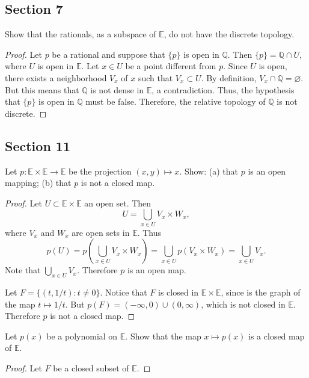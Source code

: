 \documentclass[12pt]{article}
\newcommand{\Q}{\mathbb{Q}}
\newcommand{\E}{\mathbb{E}}
\begin{document}
\subsection*{Section 7}
\begin{problem}{3} Show that the rationals, as a subspace of $\E$, do not have the discrete topology.
\end{problem}
\begin{proof}
    Let $p$ be a rational and suppose that $\{p\}$ is open in $\Q$. Then $\{p\} = \Q \cap U$, where $U$ is open in $\E.$ Let $x \in U$ be a point different from $p.$ Since $U$ is open, there exists a neighborhood $V_x$ of $x$ such that $V_x \subset U.$ By definition, $V_x \cap \Q = \varnothing$. But this means that $\Q$ is not dense in $\E$, a contradiction. Thus, the hypothesis that $\{p\}$ is open in $\Q$ must be false. Therefore, the relative topology of $\Q$ is not discrete.
\end{proof}

\subsection*{Section 11}

\begin{problem}{1} Let $p: \E \times \E \rightarrow \E$ be the projection $(x, y) \mapsto x.$ Show: (a) that $p$ is an open mapping; (b) that $p$ is not a closed map.
\end{problem}
\begin{proof}
    Let $U \subset \E \times \E$ an open set. Then 
    $$U = \bigcup_{x \in U} V_x \times W_x,$$
    where $V_x$ and $W_x$ are open sets in $\E.$ Thus
    $$p(U) = p\left(\bigcup_{x \in U} V_x \times W_x \right) = \bigcup_{x \in U}p(V_x \times W_x) = \bigcup_{x \in U}V_x.$$
    Note that $\bigcup_{x \in U}V_x$. Therefore $p$ is an open map.

Let $F = \{(t, 1/t): t \neq 0 \}$. Notice that $F$ is closed in $\E \times \E$, since is the graph of the map $t \mapsto 1/t.$ But $p(F) = (-\infty, 0) \cup (0, \infty)$, which is not closed in $\E.$ Therefore $p$ is not a closed map.
\end{proof}

\begin{problem}{2} Let $p(x)$ be a polynomial on $\E$. Show that the map $x \mapsto p(x)$ is a closed map of $\E$.
\end{problem}
\begin{proof}
Let $F$ be a closed subset of $\E.$ 
    
\end{proof}
\end{document}
